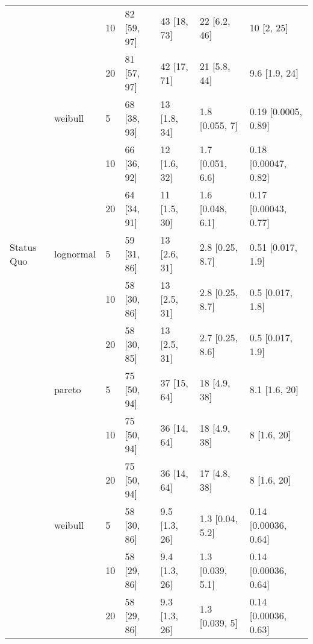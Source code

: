 \begin{tabular}{lllllll}
           &         & 10 &            82 [59, 97] &            43 [18, 73] &           22 [6.2, 46] &              10 [2, 25] \\
           &         & 20 &            81 [57, 97] &            42 [17, 71] &           21 [5.8, 44] &           9.6 [1.9, 24] \\
           & weibull & 5  &            68 [38, 93] &           13 [1.8, 34] &         1.8 [0.055, 7] &     0.19 [0.0005, 0.89] \\
           &         & 10 &            66 [36, 92] &           12 [1.6, 32] &       1.7 [0.051, 6.6] &    0.18 [0.00047, 0.82] \\
           &         & 20 &            64 [34, 91] &           11 [1.5, 30] &       1.6 [0.048, 6.1] &    0.17 [0.00043, 0.77] \\
Status Quo & lognormal & 5  &            59 [31, 86] &           13 [2.6, 31] &        2.8 [0.25, 8.7] &       0.51 [0.017, 1.9] \\
           &         & 10 &            58 [30, 86] &           13 [2.5, 31] &        2.8 [0.25, 8.7] &        0.5 [0.017, 1.8] \\
           &         & 20 &            58 [30, 85] &           13 [2.5, 31] &        2.7 [0.25, 8.6] &        0.5 [0.017, 1.9] \\
           & pareto & 5  &            75 [50, 94] &            37 [15, 64] &           18 [4.9, 38] &           8.1 [1.6, 20] \\
           &         & 10 &            75 [50, 94] &            36 [14, 64] &           18 [4.9, 38] &             8 [1.6, 20] \\
           &         & 20 &            75 [50, 94] &            36 [14, 64] &           17 [4.8, 38] &             8 [1.6, 20] \\
           & weibull & 5  &            58 [30, 86] &          9.5 [1.3, 26] &        1.3 [0.04, 5.2] &    0.14 [0.00036, 0.64] \\
           &         & 10 &            58 [29, 86] &          9.4 [1.3, 26] &       1.3 [0.039, 5.1] &    0.14 [0.00036, 0.64] \\
           &         & 20 &            58 [29, 86] &          9.3 [1.3, 26] &         1.3 [0.039, 5] &    0.14 [0.00036, 0.63] \\
\bottomrule
\end{tabular}
